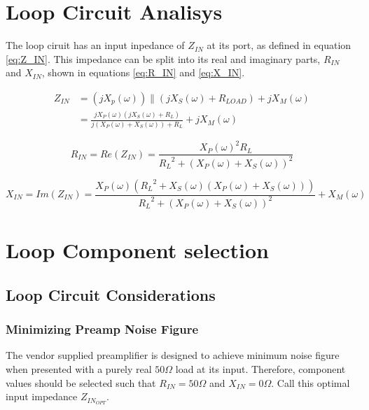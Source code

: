 \section{Loop Circuit Analisys}
The loop ciruit has an input inpedance of $Z_{IN}$ at its port, as defined in equation \ref{eq:Z_IN}. This impedance can
be split into its real and imaginary parts, $R_{IN}$ and $X_{IN}$, shown in equations \ref{eq:R_IN} and \ref{eq:X_IN}.

\begin{equation} \label{eq:Z_IN}
    \begin{aligned}
        Z_{IN}&=(jX_p(\omega))\parallel(jX_S(\omega)+R_{LOAD})+jX_M(\omega)\\
        &= \frac{j X_P(\omega) (j X_S(\omega) + R_L)}{j (X_P(\omega) + X_S(\omega)) + R_L} + j X_M(\omega)
    \end{aligned}
\end{equation}

\begin{equation} \label{eq:R_IN}
    R_{IN}=Re(Z_{IN})=\frac{{X_P(\omega)}^2 R_L}{{R_L}^2+(X_P(\omega)+X_S(\omega))^2}
\end{equation}

\begin{equation} \label{eq:X_IN}
    X_{IN}= Im(Z_{IN}) = \frac{X_P(\omega) ({R_L}^2 +
    X_S(\omega)(X_P(\omega)+X_S(\omega)))}{{R_L}^2+(X_P(\omega)+X_S(\omega))^2}+X_M(\omega)
\end{equation}

\section{Loop Component selection}

\subsection{Loop Circuit Considerations}
\subsubsection{Minimizing Preamp Noise Figure}
The vendor supplied preamplifier is designed to achieve minimum noise figure when presented with a purely real
$50\Omega$ load at its input. Therefore, component values should be selected such that $R_{IN}=50\Omega$ and
$X_{IN}=0\Omega$. Call this optimal input impedance $Z_{IN_{OPT}}$.

